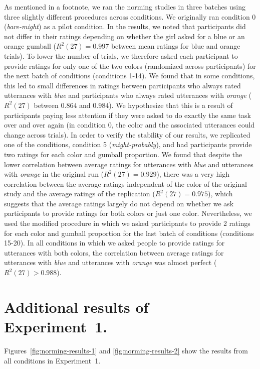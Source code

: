 \documentclass[man, floatsintext]{apa6}
\begin{document}
As mentioned in a footnote, we ran the norming studies in three batches using three slightly different procedures across conditions. We originally ran condition 0 (\emph{bare-might}) as a pilot condition. In the results, we noted that participants did not differ in their ratings depending on whether the girl asked for a blue or an orange gumball ($R^2(27)=0.997$ between mean ratings for blue and orange trials). To lower the number of trials, we therefore asked each participant to provide ratings for only one of the two colors (randomized across participants) for the next batch of conditions (conditions 1-14). We found that in some conditions, this led to small differences in ratings between participants who always rated utterances with \emph{blue} and participants who always rated utterances with \textit{orange} ($R^2(27)$ between $0.864$ and $0.984$). We hypothesize that this is a result of participants paying less attention if they were asked to do exactly the same task over and over again (in condition 0, the color and the associated utterances could change across trials). In order to verify the stability of our results, we replicated one of the conditions, condition 5 (\emph{might-probably}), and had participants provide two ratings for each color and gumball proportion. We found that despite the lower correlation between average ratings for utterances with \emph{blue} and utterances with \emph{orange} in the original run ($R^2(27)=0.929$), there was a very high correlation between the average ratings independent of the color of the original study and the average ratings of the replication ($R^2(27)=0.975$), which suggests that the average ratings largely do not depend on whether we ask participants to provide ratings for both colors or just one color. Nevertheless, we used the modified procedure in which we asked participants to provide 2 ratings for each color and gumball proportion for the last batch of conditions (conditions 15-20). In all conditions in which we asked people to provide ratings for utterances with both colors, the correlation between average ratings for utterances with \emph{blue} and utterances with \emph{orange} was almost perfect ($R^2(27)>0.988$).



\section{Additional results of Experiment~1.}
\setcounter{section}{2}


Figures~\ref{fig:norming-results-1} and \ref{fig:norming-results-2} show the results from all conditions in Experiment~1. 
\end{document}
